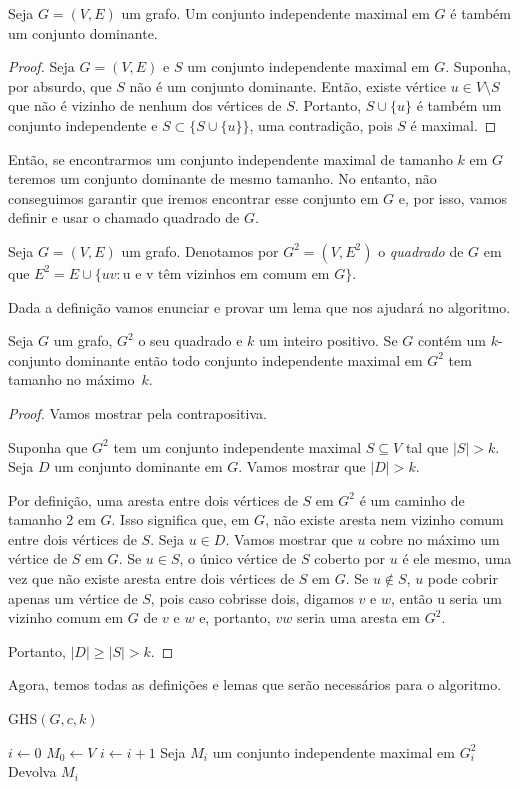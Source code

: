 \begin{lemma}\label{lemma:2.8}
    Seja $G = (V,E)$ um grafo. Um conjunto independente maximal em $G$ é também um conjunto dominante.
\end{lemma}
\begin{proof}
    Seja $G = (V,E)$ e $S$ um conjunto independente maximal em $G$. Suponha, por absurdo, que $S$ não é um conjunto dominante. Então, existe vértice $u \in V \setminus S$ que não é vizinho de nenhum dos vértices de $S$. Portanto, $S \cup \{u\}$ é também um conjunto independente e $S \subset \{S \cup \{u\}\}$, uma contradição, pois $S$ é maximal.
\end{proof}
Então, se encontrarmos um conjunto independente maximal de tamanho $k$ em $G$ teremos um conjunto dominante de mesmo tamanho. No entanto, não conseguimos garantir que iremos encontrar esse conjunto em $G$ e, por isso, vamos definir e usar o chamado quadrado de $G$.
\begin{definition}
    Seja $G= (V,E)$ um grafo. Denotamos por $G^2 = (V,E^2)$ o \emph{quadrado} de $G$ em que $E^2 = E \cup \{uv: \text{u e v têm vizinhos em comum em $G$}\}$.
\end{definition}
Dada a definição vamos enunciar e provar um lema que nos ajudará no algoritmo.
\begin{lemma}\label{lemma:2.10}
    Seja $G$ um grafo, $G^2$ o seu quadrado e $k$ um inteiro positivo. Se $G$ contém um $k$-conjunto dominante então todo conjunto independente maximal em $G^2$ tem tamanho no máximo~$k$.
\end{lemma}
\begin{proof}
    Vamos mostrar pela contrapositiva.

    Suponha que $G^2$ tem um conjunto independente maximal $S \subseteq V$ tal que $|S| > k$. Seja $D$ um conjunto dominante em $G$. Vamos mostrar que $|D| > k$.

    Por definição, uma aresta entre dois vértices de $S$ em $G^2$ é um caminho de tamanho 2 em $G$. Isso significa que, em $G$, não existe aresta nem vizinho comum entre dois vértices de $S$. Seja $u \in D$. Vamos mostrar que $u$ cobre no máximo um vértice de $S$ em $G$. 
    Se $u \in S$, o único vértice de $S$ coberto por $u$ é ele mesmo, uma vez que não existe aresta entre dois vértices de $S$ em $G$. 
    Se $u \not \in S$, $u$ pode cobrir apenas um vértice de $S$, pois caso cobrisse dois, digamos $v$ e $w$, então u seria um vizinho comum em $G$ de $v$ e $w$ e, portanto, $vw$ seria uma aresta em $G^2$.

    Portanto, $|D| \geq |S| > k$.
\end{proof}
Agora, temos todas as definições e lemas que serão necessários para o algoritmo.
\begin{algorithm}
    \caption{GHS$(G,c,k)$}
    \label{k-center:bottleneck}
    \begin{algorithmic}[1]
        \State $i \leftarrow 0$
        \State $M_0 \leftarrow V$
            \State $i\leftarrow i + 1$
            \State Seja $M_i$ um conjunto independente maximal em $G_i^2$
        \EndWhile
        \State Devolva $M_i$
    \end{algorithmic}
\end{algorithm}

